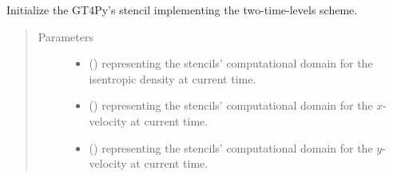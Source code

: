 \documentclass[letterpaper,10pt,english]{sphinxmanual}
\begin{document}
\begin{fulllineitems}
\begin{fulllineitems}
\end{fulllineitems}


\begin{fulllineitems}
\label{\detokenize{api:dycore.prognostic_isentropic.PrognosticIsentropicTL2._initialize_stencil}}
Initialize the GT4Py’s stencil implementing the two-time-levels scheme.
\begin{quote}\begin{description}
\item[{Parameters}] \leavevmode\begin{itemize}
\item {} 
 () \textendash{}  representing the stencils’ computational domain for the isentropic density at current time.

\item {} 
 () \textendash{}  representing the stencils’ computational domain for the \(x\)-velocity at current time.

\item {} 
 () \textendash{}  representing the stencils’ computational domain for the \(y\)-velocity at current time.

\end{itemize}

\end{description}\end{quote}

\end{fulllineitems}



\end{fulllineitems}
\end{document}
